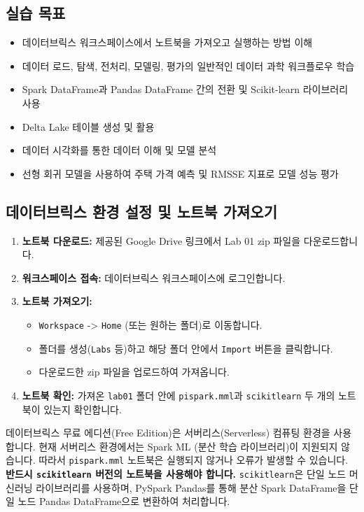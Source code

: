 \documentclass[11pt,a4paper]{article}
\theoremstyle{definition}
\newcommand{\code}[1]{\texttt{#1}}
\begin{document}
\subsection{실습 목표}
\begin{itemize}
    \item 데이터브릭스 워크스페이스에서 노트북을 가져오고 실행하는 방법 이해
    \item 데이터 로드, 탐색, 전처리, 모델링, 평가의 일반적인 데이터 과학 워크플로우 학습
    \item Spark DataFrame과 Pandas DataFrame 간의 전환 및 Scikit-learn 라이브러리 사용
    \item Delta Lake 테이블 생성 및 활용
    \item 데이터 시각화를 통한 데이터 이해 및 모델 분석
    \item 선형 회귀 모델을 사용하여 주택 가격 예측 및 RMSSE 지표로 모델 성능 평가
\end{itemize}

\subsection{데이터브릭스 환경 설정 및 노트북 가져오기}
\begin{enumerate}
    \item \textbf{노트북 다운로드:} 제공된 Google Drive 링크에서 Lab 01 zip 파일을 다운로드합니다.
    \item \textbf{워크스페이스 접속:} 데이터브릭스 워크스페이스에 로그인합니다.
    \item \textbf{노트북 가져오기:}
    \begin{itemize}
        \item \code{Workspace} -> \code{Home} (또는 원하는 폴더)로 이동합니다.
        \item 폴더를 생성(\code{Labs} 등)하고 해당 폴더 안에서 \code{Import} 버튼을 클릭합니다.
        \item 다운로드한 zip 파일을 업로드하여 가져옵니다.
    \end{itemize}
    \item \textbf{노트북 확인:} 가져온 \code{lab01} 폴더 안에 \code{pispark.mml}과 \code{scikitlearn} 두 개의 노트북이 있는지 확인합니다.
\end{enumerate}

\begin{tcolorbox}[cautionbox, title=중요: 서버리스 환경 제약사항]
데이터브릭스 무료 에디션(Free Edition)은 서버리스(Serverless) 컴퓨팅 환경을 사용합니다. 현재 서버리스 환경에서는 Spark ML (분산 학습 라이브러리)이 지원되지 않습니다. 따라서 \code{pispark.mml} 노트북은 실행되지 않거나 오류가 발생할 수 있습니다. \textbf{반드시 \code{scikitlearn} 버전의 노트북을 사용해야 합니다.} \code{scikitlearn}은 단일 노드 머신러닝 라이브러리를 사용하며, PySpark Pandas를 통해 분산 Spark DataFrame을 단일 노드 Pandas DataFrame으로 변환하여 처리합니다.
\end{tcolorbox}
\end{document}
